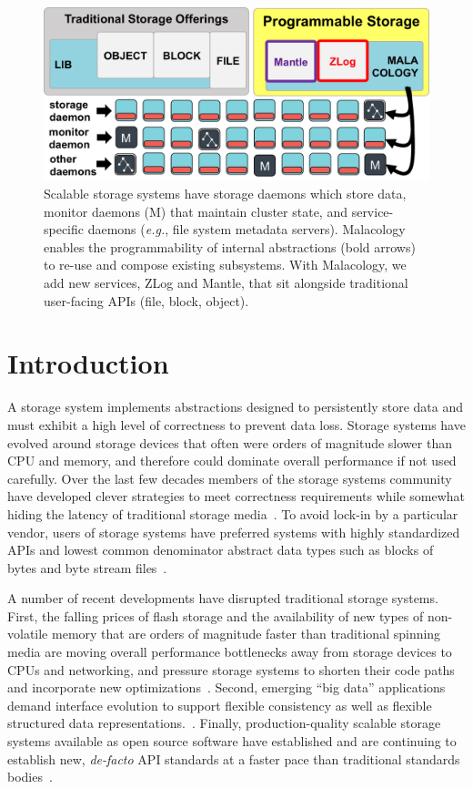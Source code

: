\documentclass[preprint]{sigplanconf-eurosys}
\begin{document}
\begin{figure}[tb]
\centering
\includegraphics{figures/overview.png}
\caption{Scalable storage systems have storage daemons which store data,
monitor daemons (M) that maintain cluster state, and service-specific daemons
({\it e.g.}, file system metadata servers). Malacology enables the programmability of
internal abstractions (bold arrows) to re-use and compose
existing subsystems.  With Malacology, we add new services, ZLog and
Mantle, that sit alongside traditional user-facing APIs (file, block,
object).}\label{fig:overview}
\end{figure}

\section{Introduction}
\label{introduction}
\label{sec:intro}

A storage system implements abstractions designed to persistently store data
and must exhibit a high level of correctness to prevent data loss.  Storage
systems have evolved around storage devices that often were orders of magnitude
slower than CPU and memory, and therefore could dominate overall performance if
not used carefully. Over the last few decades members of the storage systems
community have developed clever strategies to meet correctness requirements
while somewhat hiding the latency of traditional storage
media~\cite{brewer_disks_2016}. To avoid lock-in by a particular vendor, users
of storage systems have preferred systems with highly standardized APIs and
lowest common denominator abstract data types such as blocks of bytes and byte
stream files~\cite{armbrust_view_2010}.

A number of recent developments have disrupted traditional storage systems.
First, the falling prices of flash storage and the availability of new types of
non-volatile memory that are orders of magnitude faster than traditional
spinning media are moving overall performance bottlenecks away from storage
devices to CPUs and networking, and pressure storage systems to shorten their
code paths and incorporate new
optimizations~\cite{gray_tape_2007,gray_flash_2008}.  Second, emerging ``big
data'' applications demand interface evolution to support flexible consistency
as well as flexible structured data 
representations.~\cite{apache_contributors_parquet_2014}.  Finally, production-quality scalable
storage systems available as open source software have established and are
continuing to establish new, \emph{de-facto} API standards at a faster pace
than traditional standards
bodies~\cite{snia_implementing_2014,linux_foundation_kinetic_2015}.
\end{document}
